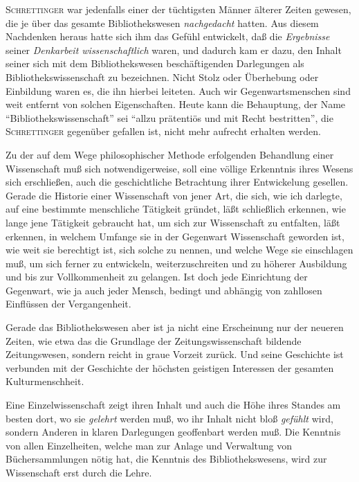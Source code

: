 \documentclass[a4paper,
fontsize=11pt,
oneside,
numbers=noperiodatend,
parskip=half-,
bibliography=totoc,
final
]{scrartcl}
\begin{document}
\textsc{Schrettinger} war jedenfalls einer der tüchtigsten Männer
älterer Zeiten gewesen, die je über das gesamte Bibliothekswesen
\emph{nachgedacht} hatten. Aus diesem Nachdenken heraus hatte sich ihm
das Gefühl entwickelt, daß die \emph{Ergebnisse} seiner \emph{Denkarbeit
wissenschaftlich} waren, und dadurch kam er dazu, den Inhalt seiner sich
mit dem Bibliothekswesen beschäftigenden Darlegungen als
Bibliothekswissenschaft zu bezeichnen. Nicht Stolz oder Überhebung oder
Einbildung waren es, die ihn hierbei leiteten. Auch wir
Gegenwartsmenschen sind weit entfernt von solchen Eigenschaften. Heute
kann die Behauptung, der Name \enquote{Bibliothekswissenschaft} sei
\enquote{allzu prätentiös und mit Recht bestritten}, die
\textsc{Schrettinger} gegenüber gefallen ist, nicht mehr aufrecht
erhalten werden.

Zu der auf dem Wege philosophischer Methode erfolgenden Behandlung einer
Wissenschaft muß sich notwendigerweise, soll eine völlige Erkenntnis
ihres Wesens sich erschließen, auch die geschichtliche Betrachtung ihrer
Entwickelung gesellen. Gerade die Historie einer Wissenschaft von jener
Art, die sich, wie ich darlegte, auf eine bestimmte menschliche
Tätigkeit gründet, läßt schließlich erkennen, wie lange jene Tätigkeit
gebraucht hat, um sich zur Wissenschaft zu entfalten, läßt erkennen, in
welchem Umfange sie in der Gegenwart Wissenschaft geworden ist, wie weit
sie berechtigt ist, sich solche zu nennen, und welche Wege sie
einschlagen muß, um sich ferner zu entwickeln, weiterzuschreiten und zu
höherer Ausbildung und bis zur Vollkommenheit zu gelangen. Ist doch jede
Einrichtung der Gegenwart, wie ja auch jeder Mensch, bedingt und
abhängig von zahllosen Einflüssen der Vergangenheit.

Gerade das Bibliothekswesen aber ist ja nicht eine Erscheinung nur der
neueren Zeiten, wie etwa das die Grundlage der Zeitungswissenschaft
bildende Zeitungswesen, sondern reicht in graue Vorzeit zurück. Und
seine Geschichte ist verbunden mit der Geschichte der höchsten geistigen
Interessen der gesamten Kulturmenschheit.

Eine Einzelwissenschaft zeigt ihren Inhalt und auch die Höhe ihres
Standes am besten dort, wo sie \emph{gelehrt} werden muß, wo ihr Inhalt
nicht bloß \emph{gefühlt} wird, sondern Anderen in klaren Darlegungen
geoffenbart werden muß. Die Kenntnis von allen Einzelheiten, welche man
zur Anlage und Verwaltung von Büchersammlungen nötig hat, die Kenntnis
des Bibliothekswesens, wird zur Wissenschaft erst durch die Lehre.
\end{document}

